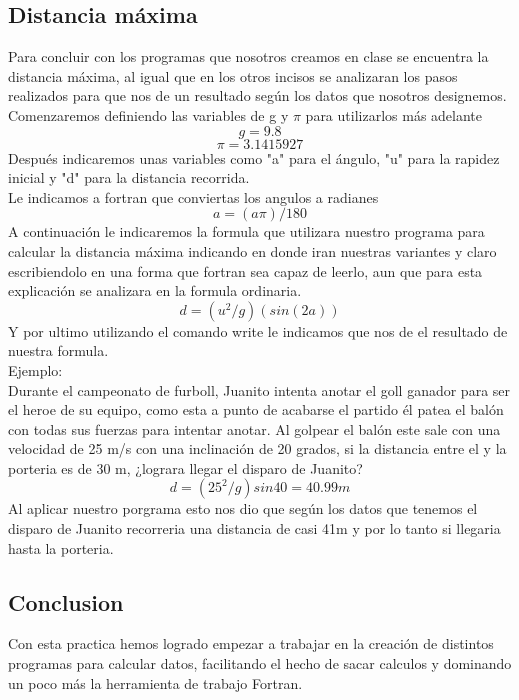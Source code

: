 \documentclass{article}
\begin{document}
\subsection{Distancia máxima}
Para concluir con los programas que nosotros creamos en clase se encuentra la distancia máxima, al igual que en los otros incisos se analizaran los pasos realizados para que nos de un resultado según los datos que nosotros designemos.\\
Comenzaremos definiendo las variables de g y \(\pi\) para utilizarlos más adelante
\[g=9.8\]
\[\pi=3.1415927\]
Después indicaremos unas variables como "a" para el ángulo, "u" para la rapidez inicial y "d" para la distancia recorrida.\\
Le indicamos a fortran que conviertas los angulos a radianes
\[a=(a\pi)/180\]
A continuación le indicaremos la formula que utilizara nuestro programa para calcular la distancia máxima indicando en donde iran nuestras variantes y claro escribiendolo en una forma que fortran sea capaz de leerlo, aun que para esta explicación se analizara en la formula ordinaria.
\[d=(u^{2}/g)(sin(2a))\]
Y por ultimo utilizando el comando write le indicamos que nos de el resultado de nuestra formula.\\
Ejemplo:\\
Durante el campeonato de furboll, Juanito intenta anotar el goll ganador para ser el heroe de su equipo, como esta a punto de acabarse el partido él patea el balón con todas sus fuerzas para intentar anotar. Al golpear el balón este sale con una velocidad de 25 m/s con una inclinación de 20 grados, si la distancia entre el y la porteria es de 30 m, ¿lograra llegar el disparo de Juanito?
\[d=(25^{2}/g)sin40=40.99m\]
Al aplicar nuestro porgrama esto nos dio que según los datos que tenemos el disparo de Juanito recorreria una distancia de casi 41m y por lo tanto si llegaria hasta la porteria.
\subsection{Conclusion}
Con esta practica hemos logrado empezar a trabajar en la creación de distintos programas para calcular datos, facilitando el hecho de sacar calculos y dominando un poco más la herramienta de trabajo Fortran.
\end{document}
